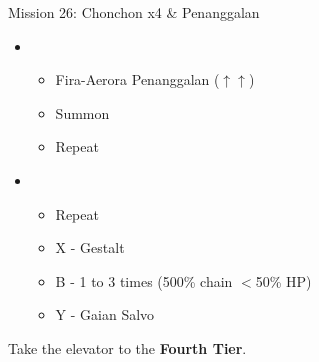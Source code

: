 \begin{multicols}{2}
\begin{battle}{Mission 26: Chonchon x4 \& Penanggalan}
\begin{itemize}
    \item \second
    \begin{itemize}
        \item Fira-Aerora Penanggalan ($\uparrow\uparrow$)
        \item Summon
        \item Repeat
    \end{itemize}
    \columnbreak
    \item \third
    \begin{itemize}
        \item Repeat
        \item X - Gestalt
        \item B - 1 to 3 times (500\% chain $<$50\% HP)
        \item Y - Gaian Salvo
    \end{itemize}
\end{itemize}
\end{battle}

Take the elevator to the \textbf{Fourth Tier}.
\end{multicols}
